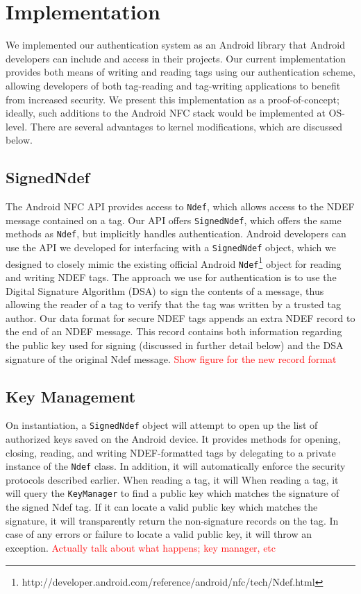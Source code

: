 \documentclass[12pt]{article}
\newcommand\TODO[1]{\textcolor{red}{#1}}
\begin{document}
\section{Implementation}
We implemented our authentication system as an Android library that Android developers can include and access in their projects.
Our current implementation provides both means of writing and reading tags using our authentication scheme, allowing developers of both tag-reading and tag-writing applications to benefit from increased security.
We present this implementation as a proof-of-concept; ideally, such additions to the Android NFC stack would be implemented at OS-level.
There are several advantages to kernel modifications, which are discussed below.

\subsection{SignedNdef}
The Android NFC API provides access to \texttt{Ndef}, which allows access to the NDEF message contained on a tag.
Our API offers \texttt{SignedNdef}, which offers the same methods as \texttt{Ndef}, but implicitly handles authentication.
Android developers can use the API we developed for interfacing with a \texttt{SignedNdef} object, which we designed to closely mimic the existing official Android \texttt{Ndef}\footnote{http://developer.android.com/reference/android/nfc/tech/Ndef.html} object for reading and writing NDEF tags.
The approach we use for authentication is to use the Digital Signature Algorithm (DSA) to sign the contents of a message, thus allowing the reader of a tag to verify that the tag was written by a trusted tag author.
Our data format for secure NDEF tags appends an extra NDEF record to the end of an NDEF message.
This record contains both information regarding the public key used for signing (discussed in further detail below) and the DSA signature of the original Ndef message.
\TODO{Show figure for the new record format}

\subsection{Key Management}

On instantiation, a \texttt{SignedNdef} object will attempt to open up the list of authorized keys saved on the Android device.
It provides methods for opening, closing, reading, and writing NDEF-formatted tags by delegating to a private instance of the \texttt{Ndef} class.
In addition, it will automatically enforce the security protocols described earlier.
When reading a tag, it will 
When reading a tag, it will query the \texttt{KeyManager} to find a public key which matches the signature of the signed Ndef tag.
If it can locate a valid public key which matches the signature, it will transparently return the non-signature records on the tag.
In case of any errors or failure to locate a valid public key, it will throw an exception. \TODO{Actually talk about what happens; key manager, etc}
\end{document}
